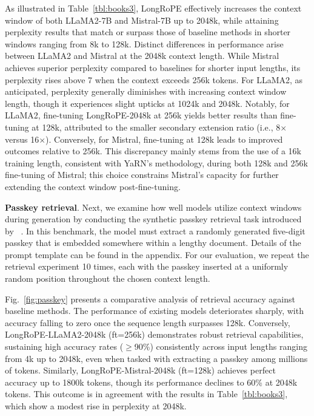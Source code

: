 As illustrated in Table~\ref{tbl:books3}, LongRoPE effectively increases the context window of both LLaMA2-7B and Mistral-7B up to 2048k, while attaining perplexity results that match or surpass those of baseline methods in shorter windows ranging from 8k to 128k. Distinct differences in performance arise between LLaMA2 and Mistral at the 2048k context length. While Mistral achieves superior perplexity compared to baselines for shorter input lengths, its perplexity rises above 7 when the context exceeds 256k tokens. For LLaMA2, as anticipated, perplexity generally diminishes with increasing context window length, though it experiences slight upticks at 1024k and 2048k. Notably, for LLaMA2, fine-tuning LongRoPE-2048k at 256k yields better results than fine-tuning at 128k, attributed to the smaller secondary extension ratio (i.e., 8$\times$ versus 16$\times$). Conversely, for Mistral, fine-tuning at 128k leads to improved outcomes relative to 256k. This discrepancy mainly stems from the use of a 16k training length, consistent with YaRN's methodology, during both 128k and 256k fine-tuning of Mistral; this choice constrains Mistral's capacity for further extending the context window post-fine-tuning.

\textbf{Passkey retrieval}. Next, we examine how well models utilize context windows during generation by conducting the synthetic passkey retrieval task introduced by ~\cite{passkey}. In this benchmark, the model must extract a randomly generated five-digit passkey that is embedded somewhere within a lengthy document. Details of the prompt template can be found in the appendix. For our evaluation, we repeat the retrieval experiment 10 times, each with the passkey inserted at a uniformly random position throughout the chosen context length.

Fig.~\ref{fig:passkey} presents a comparative analysis of retrieval accuracy against baseline methods. The performance of existing models deteriorates sharply, with accuracy falling to zero once the sequence length surpasses 128k. Conversely, LongRoPE-LLaMA2-2048k (ft=256k) demonstrates robust retrieval capabilities, sustaining high accuracy rates ($\ge$90\%) consistently across input lengths ranging from 4k up to 2048k, even when tasked with extracting a passkey among millions of tokens. Similarly, LongRoPE-Mistral-2048k (ft=128k) achieves perfect accuracy up to 1800k tokens, though its performance declines to 60\% at 2048k tokens. This outcome is in agreement with the results in Table~\ref{tbl:books3}, which show a modest rise in perplexity at 2048k.


